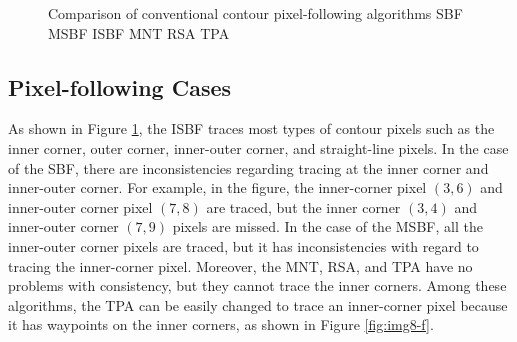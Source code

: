 \begin{figure}[htbp]
	 
	\caption{Comparison of conventional contour pixel-following algorithms \protect{} SBF \protect{} MSBF \protect{} ISBF \protect{} MNT \protect{} RSA \protect{} TPA}
	\label{fig:comparison}
\end{figure}

\subsection{Pixel-following Cases}


As shown in Figure \ref{fig:comparison}, the ISBF traces most types of contour pixels such as the inner corner, outer corner, inner-outer corner, and straight-line pixels. In the case of the SBF, there are inconsistencies regarding tracing at the inner corner and inner-outer corner. For example, in the figure, the inner-corner pixel $(3, 6)$ and inner-outer corner pixel $(7, 8)$ are traced, but the inner corner $(3, 4)$ and inner-outer corner $(7, 9)$ pixels are missed. In the case of the MSBF, all the inner-outer corner pixels are traced, but it has inconsistencies with regard to tracing the inner-corner pixel. Moreover, the MNT, RSA, and TPA have no problems with consistency, but they cannot trace the inner corners. Among these algorithms, the TPA can be easily changed to trace an inner-corner pixel because it has waypoints on the inner corners, as shown in Figure \ref{fig:img8-f}.



